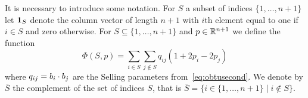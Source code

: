 \documentclass[final,leqno]{siamltex}
\begin{document}
\newcommand{\rng}{\operatorname{rng}}
\newcommand{\subrng}{\operatorname{subr}}
\newcommand{\decrng}{\operatorname{decrng}}

It is necessary to introduce some notation.  For $S$ a subset of indices $\{1,\dots,n+1\}$ let $\boldsymbol{1}_S$ denote the column vector of length $n+1$ with $i$th element equal to one if $i \in S$ and zero otherwise. %
For $S \subseteq \{1,\dots,n+1\}$ and $p \in {\mathbb R}^{n+1}$ we define the function
\[
\Phi(S, p) = \sum_{i \in S}\sum_{j \notin S}q_{ij}(1 + 2p_i - 2p_j)
\]
where $q_{ij} = b_i \cdot b_j$ are the Selling parameters from~\eqref{eq:obtusecond}.  We denote by $\bar{S}$ the complement of the set of indices $S$, that is $\bar{S} = \{ i \in \{1,\dots,n+1\} \mid i \notin S\}$. 
\end{document}
